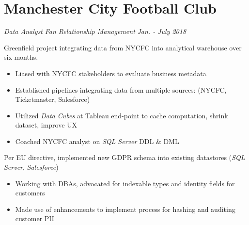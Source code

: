 \documentclass[../cv.tex]{subfiles}
\begin{document}
\section{Manchester City Football Club}
\textit{Data Analyst}
\hfill
\textit{Fan Relationship Management}
\hfill
\textit{Jan. - July 2018}
\begin{description}[style=multiline,leftmargin=3cm]
	\item[New York City FC Integration \textnormal{\\Project Owner}]
	      Greenfield project integrating data from NYCFC into analytical warehouse over six months.
		  \begin{itemize}
			\item Liased with NYCFC stakeholders to evaluate business metadata
			\item Established pipelines integrating data from multiple sources: (NYCFC, Ticketmaster, Salesforce)
			\item Utilized \textit{Data Cubes} at Tableau end-point to cache computation, shrink dataset, improve UX
			\item Coached NYCFC analyst on \textit{SQL Server} DDL \& DML
		\end{itemize}
	\item[GDPR Schema \textnormal{Technical Lead}] 
	Per EU directive, implemented new GDPR schema into existing datastores (\textit{SQL Server}, \textit{Salesforce})
	      \begin{itemize}
		    \item Working with DBAs, advocated for indexable types and identity fields for customers
		    \item Made use of enhancements to implement process for hashing and auditing customer PII

\end{itemize}
\end{description}
\end{document}
